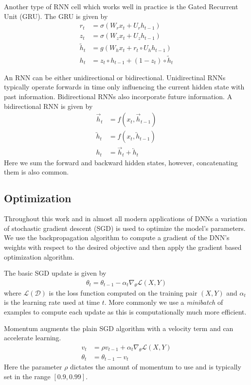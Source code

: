 Another type of RNN cell which works well in practice is the Gated Recurrent
Unit (GRU). The GRU is given by
\begin{align*}
    r_t &= \sigma(W_r x_t + U_r h_{t-1}) \\
    z_t &= \sigma(W_z x_t + U_z h_{t-1}) \\
    \tilde{h}_t &= g(W_h x_t + r_t \circ U_h h_{t-1}) \\
    h_t &= z_t \circ h_{t-1} + (1 - z_t) \circ \tilde{h}_t
\end{align*}

An RNN can be either unidirectional or bidirectional. Unidirectinal RNNs
typically operate forwards in time only influencing the current hidden state
with past information. Bidirectional RNNs also incorporate future information.
A bidirectional RNN is given by
\begin{align*}
    \overrightarrow{h}_t &= f(x_t, \overrightarrow{h}_{t-1}) \\
    \overleftarrow{h}_t &= f(x_t, \overleftarrow{h}_{t-1}) \\
    h_t &= \overrightarrow{h}_t + \overleftarrow{h}_t
\end{align*}
Here we sum the forward and backward hidden states, however, concatenating them
is also common.

\subsection{Optimization}

Throughout this work and in almost all modern applications of DNNs a variation
of stochastic gradient descent (SGD) is used to optimize the model's
parameters. We use the backpropagation algorithm to compute a gradient of the
DNN's weights with respect to the desired objective and then apply the gradient
based optimization algorithm.

The basic SGD update is given by
\begin{align*}
    \theta_{t} = \theta_{t-1} - \alpha_t \nabla_{\theta} \mathcal{L}(X, Y)
\end{align*}
where $\mathcal{L}(\mathcal{D})$ is the loss function computed on the training
pair $(X, Y)$ and $\alpha_t$ is the learning rate used at time $t$. More
commonly we use a {\it minibatch} of examples to compute each update as this is
computationally much more efficient.

Momentum augments the plain SGD algorithm with a velocity term and can accelerate
learning.
\begin{align*}
    v_t &= \rho v_{t-1} + \alpha_t \nabla_{\theta} \mathcal{L}(X, Y) \\
    \theta_t &= \theta_{t-1} - v_t 
\end{align*}
Here the parameter $\rho$ dictates the amount of momentum to use and is
typically set in the range $[0.9, 0.99]$.

